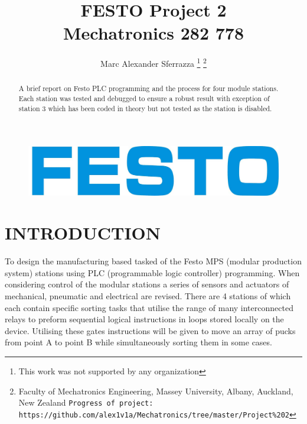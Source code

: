 \documentclass[a4paper, 10pt,  conference]{article}
\title{\LARGE \bf FESTO Project 2\\Mechatronics 282 778}
\author{Marc Alexander Sferrazza
\thanks{This work was not supported by any organization}
\thanks{Faculty of Mechatronics Engineering, Massey University, Albany, Auckland, New Zealand
        {\tt\small Progress of project: https://github.com/alex1v1a/Mechatronics/tree/master/Project\%202} } }
\begin{document}
\maketitle

\begin{figure}[h!]
  \includegraphics[width=\linewidth]{images/FESTO-Logo}
  \label{fig:FESTO-Logo}
\end{figure}

\thispagestyle{empty}
\pagestyle{empty}



\begin{abstract}

A brief report on Festo PLC programming and the process for four module stations. Each station was tested and debugged to ensure a robust result with exception of station 3 which has been coded in theory but not tested as the station is disabled.

\end{abstract}


\clearpage
\tableofcontents
\clearpage



\section{INTRODUCTION}
To design the manufacturing based tasked of the Festo MPS (modular production system) stations using PLC (programmable logic controller) programming. When considering control of the modular stations a series of sensors and actuators of mechanical, pneumatic and electrical are revised. There are 4 stations of which each contain specific sorting tasks that utilise the range of many interconnected relays to preform sequential logical instructions in loops stored locally on the device. Utilising these gates instructions will be given to move an array of pucks from point A to point B while simultaneously sorting them in some cases.
\end{document}

